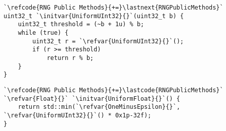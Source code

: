 \begin{lstlisting}
`\refcode{RNG Public Methods}{+=}\lastnext{RNGPublicMethods}`
uint32_t `\initvar{UniformUInt32}{}`(uint32_t b) {
    uint32_t threshold = (~b + 1u) % b;
    while (true) {
        uint32_t r = `\refvar{UniformUInt32}{}`();
        if (r >= threshold)
            return r % b;
    }
}
\end{lstlisting}

\begin{lstlisting}
`\refcode{RNG Public Methods}{+=}\lastcode{RNGPublicMethods}`
`\refvar{Float}{}` `\initvar{UniformFloat}{}`() {
    return std::min(`\refvar{OneMinusEpsilon}{}`, `\refvar{UniformUInt32}{}`() * 0x1p-32f);
}
\end{lstlisting}